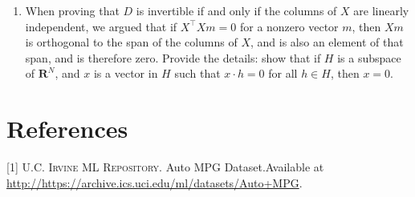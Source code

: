 \documentclass[]{article}
\providecommand{\tightlist}{%
  \setlength{\itemsep}{0pt}\setlength{\parskip}{0pt}}
\begin{document}
\begin{enumerate}
\def\labelenumi{\arabic{enumi}.}
\tightlist
\item
  When proving that \(D\) is invertible if and only if the columns of
  \(X\) are linearly independent, we argued that if
  \(X^{\intercal}Xm=0\) for a nonzero vector \(m\), then \(Xm\) is
  orthogonal to the span of the columns of \(X\), and is also an element
  of that span, and is therefore zero. Provide the details: show that if
  \(H\) is a subspace of \(\mathbf{R}^{N}\), and \(x\) is a vector in
  \(H\) such that \(x\cdot h=0\) for all \(h\in H\), then \(x=0\).
\end{enumerate}

\hypertarget{bibliography}{%
\section*{References}\label{bibliography}}

\hypertarget{refs}{}
\leavevmode\hypertarget{ref-irvine}{}%
{[}1{]} \textsc{U.C. Irvine ML Repository}. Auto MPG Dataset.Available
at \url{http://https://archive.ics.uci.edu/ml/datasets/Auto+MPG}.
\end{document}
